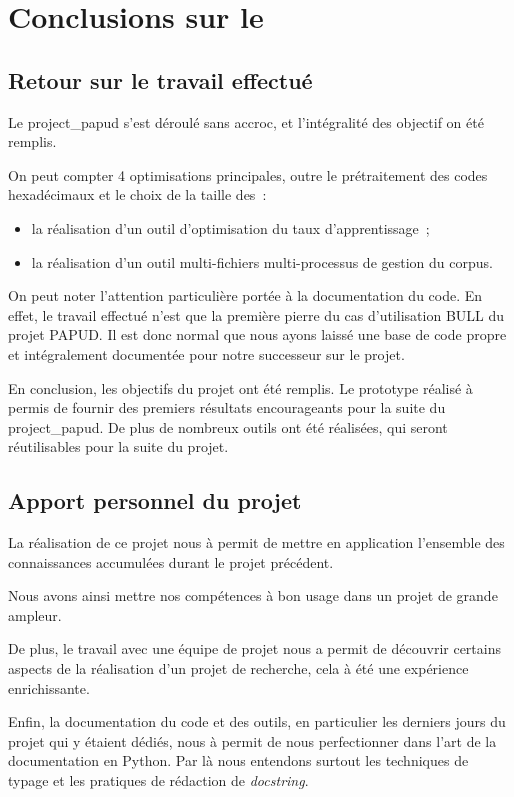 \chapter{Conclusions sur le }

\section{Retour sur le travail effectué}
Le \gls{project_papud} s'est déroulé sans accroc, et l'intégralité des objectif on été remplis.

On peut compter 4 optimisations principales, outre le prétraitement des codes hexadécimaux et le choix de la taille des~:
\begin{itemize}
	\item la réalisation d'un outil d'optimisation du taux d'apprentissage~;
	\item la réalisation d'un outil multi-fichiers multi-processus de gestion du corpus.
\end{itemize} %

On peut noter l'attention particulière portée à la documentation du code.
En effet, le travail effectué n'est que la première pierre du cas d'utilisation BULL du projet PAPUD.
Il est donc normal que nous ayons laissé une base de code propre et intégralement documentée pour notre successeur sur le projet.

En conclusion, les objectifs du projet ont été remplis. Le prototype réalisé à permis de fournir des premiers résultats encourageants pour la suite du \gls{project_papud}. De plus de nombreux outils ont été réalisées, qui seront réutilisables pour la suite du projet.

\section{Apport personnel du projet}
La réalisation de ce projet nous à permit de mettre en application l'ensemble des connaissances accumulées durant le projet précédent.

Nous avons ainsi mettre nos compétences à bon usage dans un projet de grande ampleur.

De plus, le travail avec une équipe de projet nous a permit de découvrir certains aspects de la réalisation d'un projet de recherche, cela à été une expérience enrichissante.

Enfin, la documentation du code et des outils, en particulier les derniers jours du projet qui y étaient dédiés, nous à permit de nous perfectionner dans l'art de la documentation en Python.
Par là nous entendons surtout les techniques de typage\autocite{pep483,pep484} et les pratiques de rédaction de \textit{docstring}.

